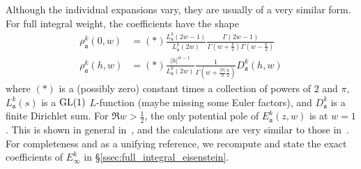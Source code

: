 Although the individual expansions vary, they are usually of a very similar form.
For full integral weight, the coefficients have the shape
\begin{align}
  \rho_\mathfrak{a}^k(0, w) &= (*) \frac{L^k_\mathfrak{a}(2w-1)}{L^k_\mathfrak{a}(2w)}
  \frac{\Gamma(2w-1)}{\Gamma(w + \frac{k}{2}) \Gamma(w - \frac{k}{2})} \\
  \rho_\mathfrak{a}^k(h, w) &= (*) \frac{\lvert h \rvert^{w-1}}{L^k_\mathfrak{a}(2w)}
  \frac{1}{\Gamma(w + \frac{\lvert h \rvert}{h} \frac{k}{2})} D_\mathfrak{a}^k(h,w)
\end{align}
where $(*)$ is a (possibly zero) constant times a collection of powers of $2$ and $\pi$,
$L^k_\mathfrak{a}(s)$ is a $\operatorname{GL}(1)$ $L$-function (maybe missing some Euler factors), and
$D_\mathfrak{a}^k$ is a finite Dirichlet sum.
For $\Re w > \frac{1}{2}$, the only potential pole of $E_\mathfrak{a}^k(z,w)$ is at $w = 1$.
This is shown in general in~\cite{Iwaniec97}, and the calculations are very similar to
those in~\cite[Chapter 3]{Goldfeld2006automorphic}.
For completeness and as a unifying reference, we recompute and state the exact
coefficients of $E_\infty^k$ in \S\ref{ssec:full_integral_eisenstein}.





